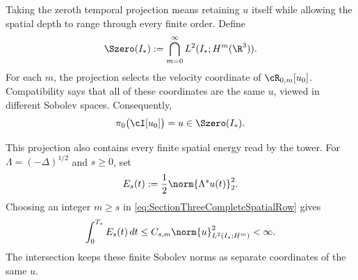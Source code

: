 Taking the zeroth temporal projection means retaining \(u\) itself while allowing the spatial depth to range through every finite order.
Define
\begin{equation}\label{eq:SectionThreeCompleteSpatialRow}
  \Szero(I_*)
  :=\bigcap_{m=0}^{\infty}L^2(I_*;H^m(\R^3)).
\end{equation}
For each \(m\), the projection selects the velocity coordinate of \(\cR_{0,m}[u_0]\).
Compatibility says that all of these coordinates are the same \(u\), viewed in different Sobolev spaces.
Consequently,
\[
  \pi_0\bigl(\cI[u_0]\bigr)
  =u\in\Szero(I_*).
\]

This projection also contains every finite spatial energy read by the tower.
For \(\Lambda=(-\Delta)^{1/2}\) and \(s\geq0\), set
\begin{equation}\label{eq:SectionThreeSpatialEnergy}
  E_s(t):=\frac12\norm{\Lambda^su(t)}_2^2.
\end{equation}
Choosing an integer \(m\geq s\) in \eqref{eq:SectionThreeCompleteSpatialRow} gives
\begin{equation}\label{eq:SectionThreeAllSpatialEnergies}
  \int_0^{T_*}E_s(t)\,dt
  \leq
  C_{s,m}\norm{u}_{L^2(I_*;H^m)}^2
  <\infty.
\end{equation}
The intersection keeps these finite Sobolev norms as separate coordinates of the same \(u\).
